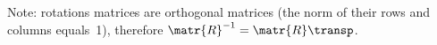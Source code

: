 \begin{refsection}
Note: rotations matrices are orthogonal matrices (the norm of their rows and columns equals~1), therefore $\matr{R}^{-1} = \matr{R}\transp$.




\end{refsection}
